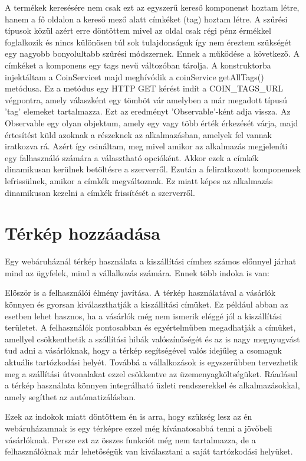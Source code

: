 A termékek keresésére nem csak ezt az egyszerű kereső komponenst hoztam létre, hanem a fő oldalon a kereső mező alatt címkéket (tag) hoztam létre. A szűrési típusok közül azért erre döntöttem mivel az oldal csak régi pénz érmékkel foglalkozik és nincs különösen túl sok tulajdonságuk így nem éreztem szükségét egy nagyobb bonyolultabb szűrési módszernek. Ennek a működése a következő. A címkéket a komponens egy tags nevű változóban tárolja. A konstruktorba injektáltam a CoinServicet majd meghívódik a coinService getAllTags() metódusa. Ez a metódus egy HTTP GET kérést indít a COIN\_TAGS\_URL végpontra, amely válaszként egy tömböt vár amelyben a már megadott típusú ’tag’ elemeket tartalmazza. Ezt az eredményt ’Observable’-ként adja vissza. Az Observable egy olyan objektum, amely egy vagy több érték érkezését várja, majd értesítést küld azoknak a részeknek az alkalmazásban, amelyek fel vannak iratkozva rá. Azért így csináltam, meg mivel amikor az alkalmazás megjeleníti egy falhasználó számára a választható opcióként. Akkor ezek a címkék dinamikusan kerülnek betöltésre a szerverről. Ezután a feliratkozott komponensek lefrissülnek, amikor a címkék megváltoznak. Ez miatt képes az alkalmazás dinamikusan kezelni a címkék frissítését a szerverről.

\section{Térkép hozzáadása}
Egy webáruháznál térkép használata a kiszállítási címhez számos előnnyel járhat mind az ügyfelek, mind a vállalkozás számára. Ennek több indoka is van: 

Először is a felhasználói élmény javítása. A térkép használatával a vásárlók könnyen és gyorsan kiválaszthatják a kiszállítási címüket. Ez például abban az esetben lehet hasznos, ha a vásárlók még nem ismerik eléggé jól a kiszállítási területet. A felhasználók pontosabban és egyértelműben megadhatják a címüket, amellyel csökkenthetik a szállítási hibák valószínűségét és az is nagy megnyugvást tud adni a vásárlóknak, hogy a térkép segítségével valós idejűleg a csomaguk aktuális tartózkodási helyét. 
Továbbá a vállalkozások is egyszerűbben tervezhetik meg a szállítási útvonalakat ezzel csökkentve az üzemenyagköltségüket. Ráadásul a térkép használata könnyen integrálható üzleti rendszerekkel és alkalmazásokkal, amely segíthet az autómatizálásban. 

Ezek az indokok miatt döntöttem én is arra, hogy szükség lesz az én webáruházamnak is egy térképre ezzel még kívánatosabbá tenni a jövőbeli vásárlóknak. Persze ezt az összes funkciót még nem tartalmazza, de a felhasználóknak már lehetőségük van kiválasztani a saját tartózkodási helyüket.

